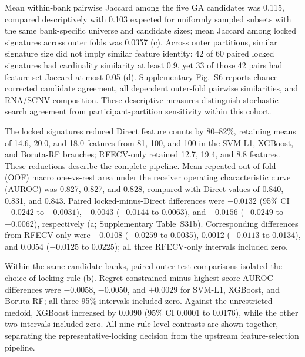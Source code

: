 Mean within-bank pairwise Jaccard among the five GA candidates was 0.115, compared descriptively with 0.103 expected for uniformly sampled subsets with the same bank-specific universe and candidate sizes; mean Jaccard among locked signatures across outer folds was 0.0357 (c). Across outer partitions, similar signature size did not imply similar feature identity: 42 of 60 paired locked signatures had cardinality similarity at least 0.9, yet 33 of those 42 pairs had feature-set Jaccard at most 0.05 (d). Supplementary Fig.~S6 reports chance-corrected candidate agreement, all dependent outer-fold pairwise similarities, and RNA/SCNV composition. These descriptive measures distinguish stochastic-search agreement from participant-partition sensitivity within this cohort.

The locked signatures reduced Direct feature counts by 80--82\%, retaining means of 14.6, 20.0, and 18.0 features from 81, 100, and 100 in the SVM-L1, XGBoost, and Boruta-RF branches; RFECV-only retained 12.7, 19.4, and 8.8 features. These reductions describe the complete pipeline. Mean repeated out-of-fold (OOF) macro one-vs-rest area under the receiver operating characteristic curve (AUROC) was 0.827, 0.827, and 0.828, compared with Direct values of 0.840, 0.831, and 0.843. Paired locked-minus-Direct differences were $-0.0132$ (95\% CI $-0.0242$ to $-0.0031$), $-0.0043$ ($-0.0144$ to 0.0063), and $-0.0156$ ($-0.0249$ to $-0.0062$), respectively (a; Supplementary Table~S31b). Corresponding differences from RFECV-only were $-0.0108$ ($-0.0259$ to 0.0035), 0.0012 ($-0.0113$ to 0.0134), and 0.0054 ($-0.0125$ to 0.0225); all three RFECV-only intervals included zero.

Within the same candidate banks, paired outer-test comparisons isolated the choice of locking rule (b). Regret-constrained-minus-highest-score AUROC differences were $-0.0058$, $-0.0050$, and $+0.0029$ for SVM-L1, XGBoost, and Boruta-RF; all three 95\% intervals included zero. Against the unrestricted medoid, XGBoost increased by 0.0090 (95\% CI 0.0001 to 0.0176), while the other two intervals included zero. All nine rule-level contrasts are shown together, separating the representative-locking decision from the upstream feature-selection pipeline.

